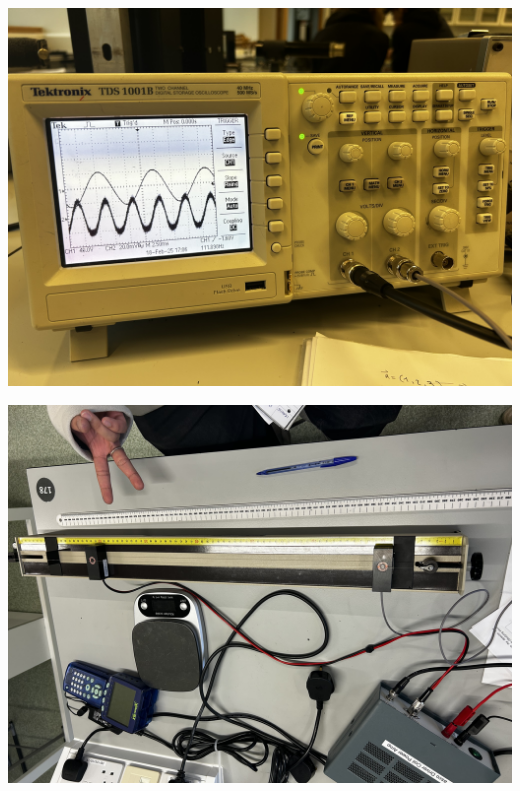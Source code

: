 \documentclass[12pt]{article}
\begin{document}
\begin{minipage}{.31\textwidth}
    \captionsetup{hypcap=false}
    \includegraphics[width=\linewidth]{wave exp 1.jpeg}
    \label{fig:oscil}
\end{minipage}
\hfill
\begin{minipage}{.31\textwidth}
    \captionsetup{hypcap=false}
    \includegraphics[width=\linewidth, angle=180]{wave exp 2.jpeg}
    \label{fig:exp}
\end{minipage}
\hfill
\end{document}
